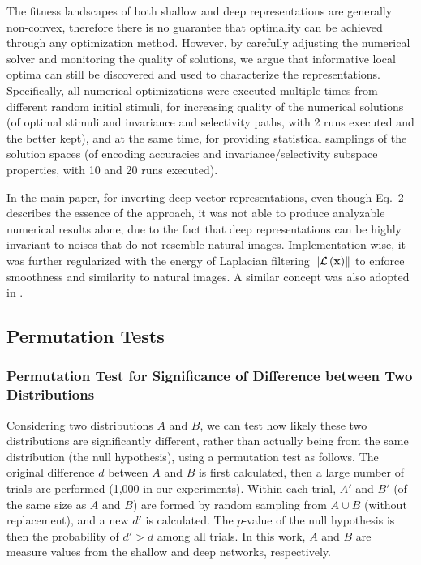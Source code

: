\documentclass{article} %
\begin{document}
The fitness landscapes of both shallow and deep representations are generally non-convex, therefore there is no guarantee that optimality can be achieved through any optimization method.
However, by carefully adjusting the numerical solver and monitoring the quality of solutions, we argue that informative local optima can still be discovered and used to characterize the representations.
Specifically, all numerical optimizations {were} executed multiple times from different random initial stimuli, for increasing quality of the numerical solutions (of optimal stimuli and invariance and selectivity paths, with 2 runs executed and the better kept), and at the same time, for providing statistical samplings of the solution spaces (of encoding accuracies and invariance/selectivity subspace properties, with 10 and 20 runs executed).

In the main paper, for inverting deep vector representations, even though Eq.~2  describes the essence of the approach, it was not able to produce analyzable numerical results alone, due to the fact that deep representations can be highly invariant to noises that do not resemble natural images.
Implementation-wise, it was further regularized with the energy of Laplacian filtering $\left\| \mathcal{L} \left( \bf{x} \right) \right\|$ to enforce smoothness and similarity to natural images.
A similar concept was also adopted in \cite{mahendran2014understanding}.

\subsection{Permutation Tests \cite{fisher1935design, pitman1938significance}}

\subsubsection{Permutation Test for Significance of Difference between Two Distributions}

Considering two distributions $A$ and $B$, we can test how likely these two distributions are significantly different, rather than actually being from the same distribution (the null hypothesis), using a permutation test as follows. The original difference $d$ between $A$ and $B$ is first calculated, then a large number of trials are performed (1,000 in our experiments). Within each trial, $A'$ and $B'$ (of the same size as $A$ and $B$) are formed by random sampling from $A \cup B$ (without replacement), and a new $d'$ is calculated. The $p$-value of the null hypothesis is then the probability of $d' > d$ among all trials. In this work, $A$ and $B$ are measure values from the shallow and deep networks, respectively.
\end{document}
